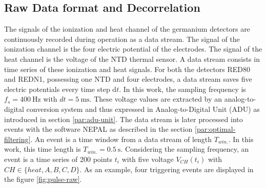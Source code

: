\subsection{Raw Data format and Decorrelation}
\label{par:data-format}

The signals of the ionization and heat channel of the germanium detectors are continuously recorded during operation as a data stream. The signal of the ionization channel is the four electric potential of the electrodes. The signal of the heat channel is the voltage of the NTD thermal sensor. A data stream consists in time series of these ionization and heat signals. For both the detectors RED80 and REDN1, possessing one NTD and four electrodes, a data stream saves five electric potentials every time step $\mathrm{d}t$. In this work, the sampling frequency is $f_s = \SI{400}{\Hz}$ with $dt = \SI{5}{\milli\s}$. These voltage values are extracted by an analog-to-digital conversion system and thus expressed in Analog-to-Digital Unit (ADU) as introduced in section \ref{par:adu-unit}. The data stream is later processed into events with the software NEPAL as described in the section \ref{par:optimal-filtering}. An event is a time window from a data stream of length $T_{win.}$. In this work, this time length is $T_{win.}=\SI{0.5}{\s}$. Considering the sampling frequency, an event is a time series of 200 points $t_i$ with five voltage $V_{CH}(t_i)$ with $CH \in \{ heat, A, B, C, D \}$. As an example, four triggering events are displayed in the figure \ref{fig:pulse-raw}.

